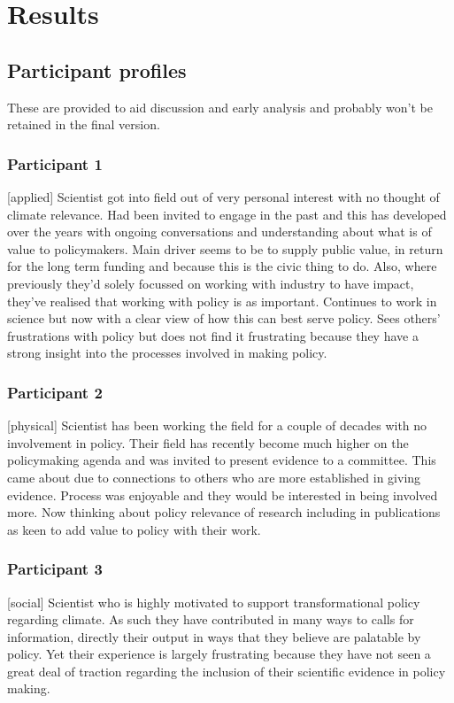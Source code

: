 \chapter{Results}\label{ch:results}
\section{Participant profiles}\label{sec:profiles}
These are provided to aid discussion and early analysis and probably won't be retained in the final version.

\subsection{Participant 1}\label{sec:p1}
[applied] Scientist got into field out of very personal interest with no thought of climate relevance. Had been invited to engage in the past and this has developed over the years with ongoing conversations and understanding about what is of value to policymakers. Main driver seems to be to supply public value, in return for the long term funding and because this is the civic thing to do. Also, where previously they'd solely focussed on working with industry to have impact, they've realised that working with policy is as important. Continues to work in science but now with a clear view of how this can best serve policy. Sees others' frustrations with policy but does not find it frustrating because they have a strong insight into the processes involved in making policy.

\subsection{Participant 2}\label{sec:p2}
[physical] Scientist has been working the field for a couple of decades with no involvement in policy. Their field has recently become much higher on the policymaking agenda and was invited to present evidence to a committee. This came about due to connections to others who are more established in giving evidence. Process was enjoyable and they would be interested in being involved more. Now thinking about policy relevance of research including in publications as keen to add value to policy with their work.

\subsection{Participant 3}\label{sec:p3}
[social] Scientist who is highly motivated to support transformational policy regarding climate. As such they have contributed in many ways to calls for information, directly their output in ways that they believe are palatable by policy. Yet their experience is largely frustrating because they have not seen a great deal of traction regarding the inclusion of their scientific evidence in policy making.


